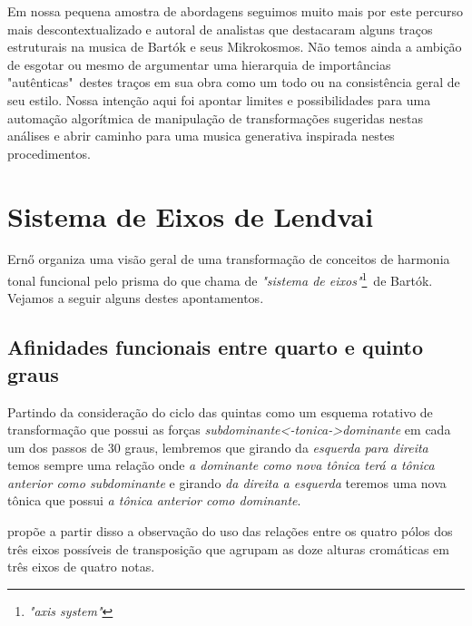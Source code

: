 \documentclass[
	12pt,				%
	openright,			%
	twoside,			%
	a4paper,			%
	english,			%
	french,				%
	spanish,			%
	brazil				%
	]{abntex2}
\begin{document}
Em nossa pequena amostra de abordagens seguimos muito mais por este percurso mais descontextualizado e autoral de analistas que destacaram alguns traços estruturais na musica de Bartók e seus Mikrokosmos. Não temos ainda a ambição de esgotar ou mesmo de argumentar uma hierarquia de importâncias "autênticas"\ destes traços em sua obra como um todo ou na consistência geral de seu estilo. Nossa intenção aqui foi apontar limites e possibilidades para uma automação algorítmica de manipulação de transformações sugeridas nestas análises e abrir caminho para uma musica generativa inspirada nestes procedimentos.

\section{Sistema de Eixos de Lendvai}
\label{lendvai_eixos}

Ern{\H{o}}  organiza uma visão geral de uma transformação de conceitos de harmonia tonal funcional pelo prisma do que chama de \textit{"sistema de eixos"}\footnote{\textit{"axis system"}}\ de Bartók. Vejamos a seguir alguns destes apontamentos. \pagebreak


\subsection{Afinidades funcionais entre quarto e quinto graus}

Partindo da consideração do ciclo das quintas como um esquema rotativo de transformação que possui as forças \textit{subdominante<-tonica->dominante} em cada um dos passos de 30 graus, lembremos que girando da \textit{esquerda para direita} temos sempre uma relação onde \textit{a dominante como nova tônica terá a tônica anterior como subdominante} e girando \textit{da direita a esquerda} teremos uma nova tônica que possui \textit{a tônica anterior como dominante}. 

 propõe a partir disso a observação do uso das relações entre os quatro pólos dos três eixos possíveis de transposição que agrupam as doze alturas cromáticas em três eixos de quatro notas. 
\end{document}
